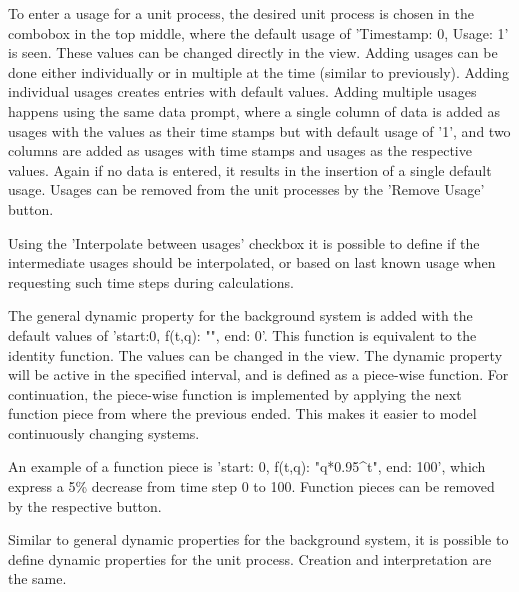 To enter a usage for a unit process, the desired unit process is chosen in the combobox in the top middle, where the default usage of 'Timestamp: 0, Usage: 1' is seen. These values can be changed directly in the view. Adding usages can be done either individually or in multiple at the time (similar to previously). Adding individual usages creates entries with default values. Adding multiple usages happens using the same data prompt, where a single column of data is added as usages with the values as their time stamps but with default usage of '1', and two columns are added as usages with time stamps and usages as the respective values. Again if no data is entered, it results in the insertion of a single default usage. Usages can be removed from the unit processes by the 'Remove Usage' button.

Using the 'Interpolate between usages' checkbox it is possible to define if the intermediate usages should be interpolated, or based on last known usage when requesting such time steps during calculations.


The general dynamic property for the background system is added with the default values of 'start:0, f(t,q): "", end: 0'. This function is equivalent to the identity function. The values can be changed in the view. The dynamic property will be active in the specified interval, and is defined as a piece-wise function. For continuation, the piece-wise function is implemented by applying the next function piece from where the previous ended. This makes it easier to model continuously changing systems.

An example of a function piece is 'start: 0, f(t,q): "q*0.95{\textasciicircum}t", end: 100', which express a 5\% decrease from time step 0 to 100. Function pieces can be removed by the respective button.


Similar to general dynamic properties for the background system, it is possible to define dynamic properties for the unit process. Creation and interpretation are the same.

